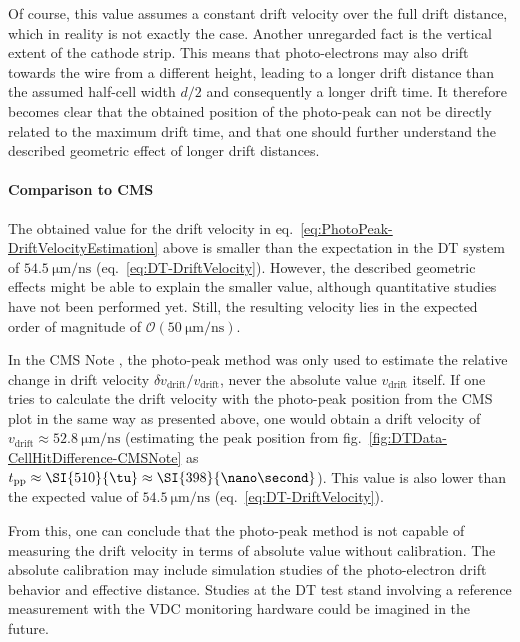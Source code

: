 Of course, this value assumes a constant drift velocity over the full drift distance, which in reality is not exactly the case. Another unregarded fact is the vertical extent of the cathode strip. This means that photo-electrons may also drift towards the wire from a different height, leading to a longer drift distance than the assumed half-cell width $d/2$ and consequently a longer drift time. It therefore becomes clear that the obtained position of the photo-peak can not be directly related to the maximum drift time, and that one should further understand the described geometric effect of longer drift distances.
\paragraph{Comparison to CMS}
The obtained value for the drift velocity in eq.\ \ref{eq:PhotoPeak-DriftVelocityEstimation} above is smaller than the expectation in the \ac{DT} system of $\SI{54.5}{\micro\meter/\nano\second}$ (eq.\ \ref{eq:DT-DriftVelocity}). However, the described geometric effects might be able to explain the smaller value, although quantitative studies have not been performed yet. Still, the resulting velocity lies in the expected order of magnitude of $\mathcal{O}(\SI{50}{\micro\meter/\nano\second})$.
\par In the CMS Note \cite{CMS-NOTE-2008-003}, the photo-peak method was only used to estimate the relative change in drift velocity $\delta v_\text{drift} / v_\text{drift}$, never the absolute value $v_\text{drift}$ itself. If one tries to calculate the drift velocity with the photo-peak position from the \ac{CMS} plot in the same way as presented above, one would obtain a drift velocity of $v_\text{drift}\approx\SI{52.8}{\micro\meter/\nano\second}$ (estimating the peak position from fig.\ \ref{fig:DTData-CellHitDifference-CMSNote} as $t_\text{pp}\approx\SI{510}{\tu}\approx\SI{398}{\nano\second}$). This value is also lower than the expected value of $\SI{54.5}{\micro\meter/\nano\second}$ (eq.\ \ref{eq:DT-DriftVelocity}).
\par From this, one can conclude that the photo-peak method is not capable of measuring the drift velocity in terms of absolute value without calibration. The absolute calibration may include simulation studies of the photo-electron drift behavior and effective distance. Studies at the \ac{DT} test stand involving a reference measurement with the \ac{VDC} monitoring hardware \cite{DT-VDC-System} could be imagined in the future.
